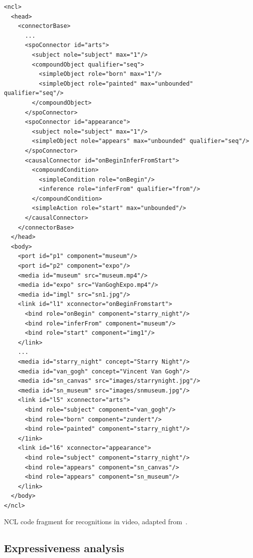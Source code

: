 \begin{verbatim}
<ncl>
  <head>
    <connectorBase>
      ...
      <spoConnector id="arts">
        <subject nole="subject" max="1"/>
        <compoundObject qualifier="seq">
          <simpleObject role="born" max="1"/>
          <simpleObject role="painted" max="unbounded" qualifier="seq"/>
        </compoundObject>
      </spoConnector>
      <spoConnector id="appearance">
        <subject nole="subject" max="1"/>
        <simpleObject nole="appears" max="unbounded" qualifier="seq"/>
      </spoConnector>
      <causalConnector id="onBeginInferFromStart">
        <compoundCondition>
          <simpleCondition role="onBegin"/>
          <inference role="inferFrom" qualifier="from"/>
        </compoundCondition>
        <simpleAction role="start" max="unbounded"/>
      </causalConnector>
    </connectorBase>
  </head>
  <body>
    <port id="p1" component="museum"/>
    <port id="p2" component="expo"/>
    <media id="museum" src="museum.mp4"/>
    <media id="expo" src="VanGoghExpo.mp4"/>
    <media id="imgl" src="sn1.jpg"/>
    <link id="l1" xconnector="onBeginFromstart">
      <bind role="onBegin" component="starry_night"/>
      <bind role="inferFrom" component="museum"/>
      <bind role="start" component="img1"/>
    </link>
    ...
    <media id="starry_night" concept="Starry Night"/>
    <media id="van_gogh" concept="Vincent Van Gogh"/>
    <media id="sn_canvas" src="images/starrynight.jpg"/>
    <media id="sn_museum" src="images/snmuseum.jpg"/>
    <link id="l5" xconnector="arts">
      <bind role="subject" component="van_gogh"/>
      <bind role="born" component="zundert"/>
      <bind role="painted" component="starry_night"/>
    </1ink>
    <link id="l6" xconnector="appearance">
      <bind role="subject" component="starry_night"/>
      <bind role="appears" component="sn_canvas"/>
      <bind role="appears" component="sn_museum"/>
    </link>
  </body>
</ncl>
\end{verbatim}

\begin{listing}[!ht]
    \caption[NCL code fragment for recognitions in video]{NCL code fragment for recognitions in video, adapted from~\cite{moreno_extending_2017}.}
    \captionvspace
    \label{list:moreno}
\end{listing}

\subsection{Expressiveness analysis}
\label{sec:state:allen}

